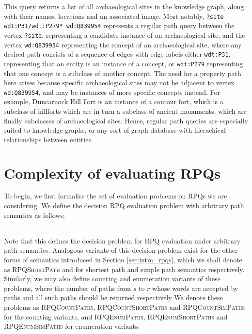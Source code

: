\documentclass{article}
\begin{document}
This query returns a list of all archaeological sites in the knowledge graph, along with their names, locations and an associated image. Most notably, \texttt{?site wdt:P31/wdt:P279* wd:Q839954} represents a regular path query between the vertex \texttt{?site}, representing a candidate instance of an archaeological site, and the vertex \texttt{wd:Q839954} representing the concept of an archaeological site, where any desired path consists of a sequence of edges with edge labels either \texttt{wdt:P31}, representing that an entity is an instance of a concept, or \texttt{wdt:P279} representing that one concept is a subclass of another concept. The need for a property path here arises because specific archaeological sites may not be adjacent to vertex \texttt{wd:Q839954}, and may be instances of more specific concepts instead. For example, Duncarnock Hill Fort is an instance of a contour fort, which is a subclass of hillforts which are in turn a subclass of ancient monuments, which are finally subclasses of archaeological sites. Hence, regular path queries are especially suited to knowledge graphs, or any sort of graph database with hierachical relationships between entities.

\section{Complexity of evaluating RPQs}
\label{sec:complexity}

To begin, we first formalise the set of evaluation problems on RPQs we are considering. We define the decision RPQ evaluation problem with arbitrary path semantics as follows:

 \\

Note that this defines the decision problem for RPQ evaluation under arbitrary path semantics. Analogous variants of this decision problem exist for the other forms of semantics introduced in Section \ref{sec:intro_rpqs}, which we shall denote as \textsc{RPQShortPath} and  for shortest path and simple path semantics respectively. Similarly, we may also define counting and enumeration variants of these problems, where the number of paths from $s$ to $r$ whose words are accepted by paths and all such paths should be returned respectively We denote these problems as \textsc{RPQCountPaths}, \textsc{RPQCountShortPaths} and \textsc{RPQCountSimPaths} for the counting variants, and \textsc{RPQEnumPaths}, \textsc{RPQEnumShortPaths} and \textsc{RPQEnumSimPaths} for enumeration variants.
\end{document}
